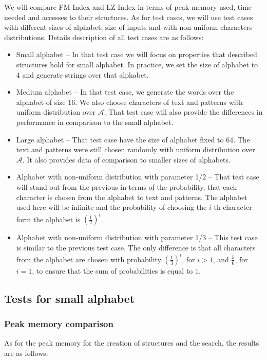 We will compare FM-Index and LZ-Index in terms of peak memory used, time needed and accesses to their structures. As for test cases, we will use test cases with different sizes of alphabet, size of inputs and with non-uniform characters distributions. Details description of all test cases are as follows:
\begin{itemize}
    \item Small alphabet -- In that test case we will focus on properties that described structures hold for small alphabet. In practice, we set the size of alphabet to $4$ and generate strings over that alphabet.
    \item Medium alphabet -- In that test case, we generate the words over the alphabet of size $16$. We also choose characters of text and patterns with uniform distribution over $\mathcal{A}$. That test case will also provide the differences in performance in comparison to the small alphabet.
    \item Large alphabet -- That test case have the size of alphabet fixed to $64$. The text and patterns were still chosen randomly with uniform distribution over $\mathcal{A}$. It also provides data of comparison to smaller sizes of alphabets.
    \item Alphabet with non-uniform distribution with parameter 1/2 -- That test case will stand out from the previous in terms of the probability, that each character is chosen from the alphabet to text and patterns. The alphabet used here will be infinite and the probability of choosing the $i$-th character form the alphabet is $(\frac{1}{2})^i$.
    \item Alphabet with non-uniform distribution with parameter 1/3 -- This test case is similar to the previous test case. The only difference is that all characters from the alphabet are chosen with probability $(\frac{1}{3})^i$, for $i > 1$, and $\frac{5}{6}$, for $i = 1$, to ensure that the sum of probabilities is equal to $1$.
\end{itemize}

\subsection{Tests for small alphabet}
\subsubsection{Peak memory comparison}
As for the peak memory for the creation of structures and the search, the results are as follows:

